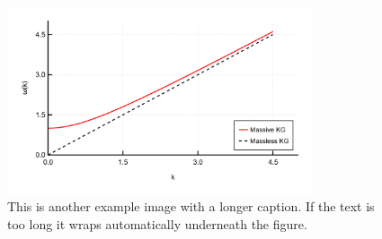 \lipsum[3]
\lipsum[3-5]

\begin{figure}[!hb]
	\centering
	\includegraphics[width=0.8\textwidth]{figures/klein_gordon_DR}
	\caption[Example figure 2]{This is another example image with a longer caption. If the text is too long it wraps automatically underneath the figure. }
	\label{fig:richtmyerstencil}
\end{figure}

